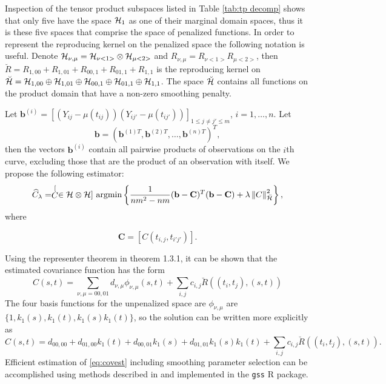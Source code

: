 Inspection of the tensor product subspaces listed in Table \ref{tab:tp decomp} shows that only five have the space $\mathcal{H}_1$ as one of their marginal domain spaces, thus it is these five spaces that comprise the space of penalized functions. In order to represent the reproducing kernel on the penalized space the following notation is useful. Denote $\mathcal{H}_{\nu, \mu}=\mathcal{H}_{\nu <1>}\otimes \mathcal{H}_{\mu <2>}$ and $R_{\nu, \mu}=R_{\nu <1>}R_{\mu <2>}$, then $\breve{R} = R_{1,00}+R_{1,01}+R_{00,1}+R_{01,1}+R_{1,1}$ is the reproducing kernel on $\breve{\mathcal{H}} = \mathcal{H}_{1,00}\oplus\mathcal{H}_{1,01}\oplus\mathcal{H}_{00,1}\oplus\mathcal{H}_{01,1}\oplus\mathcal{H}_{1,1}$. The space $\breve{\mathcal{H}}$ contains all functions on the product domain that have a non-zero smoothing penalty.

Let $\mathbf{b}^{(i)} = [(Y_{ij}-\mu(t_{ij}))(Y_{ij'}-\mu(t_{ij'}))]_{1\leq j\neq j'\leq m}$, $i=1, \dots, n$. Let
\[ \mathbf{b} = (\mathbf{b}^{(1)T}, \mathbf{b}^{(2)T}, \dots, \mathbf{b}^{(n)T} )^T, \]
then the vectors $\mathbf{b}^{(i)}$ contain all pairwise products of observations on the $i$th curve, excluding those that are the product of an observation with itself. We propose the following estimator:
\[ \widehat{C}_{\lambda}=\stackrel[C \in \mathcal{H}\otimes \mathcal{H}]{}{\text{ argmin}} \left\{\frac{1}{nm^2-nm} (\mathbf{b} - \mathbf{C})^T(\mathbf{b} - \mathbf{C})+\lambda\left\Vert C\right\Vert _{\breve{\mathcal{H}}}^{2} \right\}, \]
where

\[ \mathbf{C} = [C(t_{i,j}, t_{i'j'})]. \]

Using the representer theorem in \cite{Wahba:1990} theorem 1.3.1, it can be shown that the estimated covariance function has the form 
\begin{equation}
	\hat{C}(s,t) = \sum_{\nu, \mu=00,01}d_{\nu,\mu}\phi_{\nu,\mu}(s,t) + \sum_{i,j}c_{i,j}\breve{R}((t_i,t_j),(s,t))	
\end{equation}
The four basis functions for the unpenalized space are $\phi_{\nu,\mu}$ are $\{ 1, k_1(s), k_1(t), k_1(s)k_1(t) \}$, so the solution can be written more explicitly as 
\begin{equation}
	\hat{C}(s,t) = d_{00,00} + d_{01,00}k_1(t) + d_{00,01}k_1(s) + d_{01,01}k_1(s)k_1(t) + \sum_{i,j}c_{i,j}\breve{R}((t_i,t_j),(s,t)). \label{eq:covest} 
\end{equation}
Efficient estimation of \eqref{eq:covest} including smoothing parameter selection can be accomplished using methods described in \cite{Gu2002} and implemented in the \texttt{gss} R package. 

